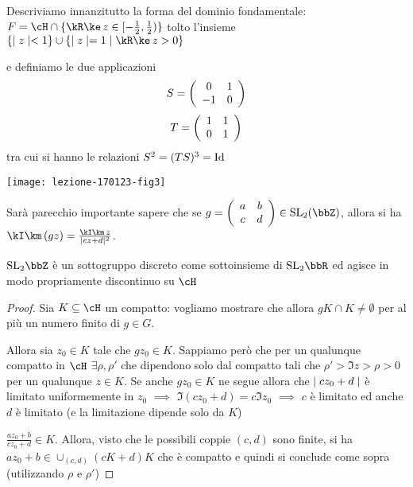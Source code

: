 Descriviamo innanzitutto la forma del dominio fondamentale:
$ F = \cH \cap \{ \Re z \in [ -\frac{1}{2}, \frac{1}{2} ) \} $
tolto l'insieme $\{ \abs{z} < 1 \} \cup \{ \abs{z} = 1 \mid \Re z > 0 \}$

e definiamo le due applicazioni
$$ S = \left({\begin{array}{cc} 0 & 1 \\ -1 & 0 \\ \end{array}}\right) $$
$$ T = \left({\begin{array}{cc} 1 & 1 \\ 0 & 1 \\ \end{array}}\right) $$
tra cui si hanno le relazioni $S^2 = (TS)^3 = \text{Id}$

\begin{center}
  \texttt{[image: lezione-170123-fig3]}
\end{center}

\begin{osservazione}
  Sarà parecchio importante sapere che se
  $g = \lbr{\begin{array}{cc} a & b \\ c & d \\ \end{array}} \in
  \SL_2(\bbZ)$, allora si ha $\Im (gz) = \frac{\Im z}{\abs{cz + d}^2}$.
\end{osservazione}

\begin{lemma}
  $\SL_2 \bbZ$ è un sottogruppo discreto come sottoinsieme di $\SL_2 \bbR$
  ed agisce in modo propriamente discontinuo su $\cH$
\end{lemma}
\begin{proof}
  Sia $K \subseteq \cH$ un compatto: vogliamo mostrare che allora
  $gK \cap K \neq \emptyset$ per al più un numero finito di $g \in G$.

  Allora sia $z_0 \in K$ tale che $g z_0 \in K$. Sappiamo però che per
  un qualunque compatto in $\cH$ $\exists \rho, \rho'$ che dipendono
  solo dal compatto tali che $\rho' > \Im z > \rho > 0$ per un qualunque
  $z \in K$. Se anche $g z_0 \in K$ ne segue allora che $\mid cz_0 + d \mid$
  è limitato uniformemente in $z_0$ $\implies$
  $\Im (cz_0 + d) = c \Im z_0$ $\implies$ $c$ è limitato ed anche $d$ è
  limitato (e la limitazione dipende solo da $K$)

  $\frac{a z_0 + b}{c z_0 + d} \in K$. Allora, visto che le possibili
  coppie $(c, d)$ sono finite, si ha
  $a z_0 + b \in \cup_{(c, d)} (cK + d)K$ che è compatto e quindi si
  conclude come sopra (utilizzando $\rho$ e $\rho'$)
\end{proof}

